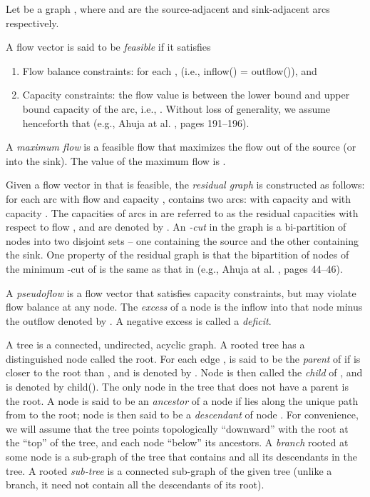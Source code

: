 \documentclass{article}
\begin{document}
Let  be a graph , where  and  are the source-adjacent and sink-adjacent arcs respectively.

A flow vector  is said to be {\em feasible} if it satisfies
\begin{enumerate}
\item Flow balance constraints: for each ,  (i.e., inflow() = outflow()), and
\item Capacity constraints: the flow value is between the lower bound and upper bound capacity of the arc, i.e.,  .  Without loss of generality, we assume henceforth that  (e.g., Ahuja at al. \cite{AhuMO93}, pages 191--196).
\end{enumerate}

A {\em maximum flow} is a feasible flow  that maximizes the flow out of the source (or into the sink).  The value of the maximum flow is .

Given a flow vector  in  that is feasible, the {\em residual graph}  is constructed as follows: for each arc  with flow  and capacity ,  contains two arcs:  with capacity  and  with capacity .  The capacities of arcs in  are referred to as the residual capacities with respect to flow , and are denoted by .  An {\em -cut} in the graph is a bi-partition of nodes into two disjoint sets -- one containing the source and the other containing the sink.  One property of the residual graph is that the bipartition of nodes of the minimum -cut of  is the same as that in  (e.g., Ahuja at al. \cite{AhuMO93}, pages 44--46).

A {\em pseudoflow}  is a flow vector that satisfies capacity constraints, but may violate flow balance at any node. The {\em excess} of a node  is the inflow into that node minus the outflow denoted by . A negative excess is called a {\em deficit}.

A tree  is a connected, undirected, acyclic graph.  A rooted tree has a distinguished node  called the root. For each edge ,  is said to be the {\em parent} of  if  is closer to the root than , and is denoted by . Node  is then called the {\em child} of , and is denoted by child(). The only node in the tree that does not have a parent is the root. A node  is said to be an {\em ancestor} of a node  if  lies along the unique path from  to the root; node  is then said to be a {\em descendant} of node . For convenience, we will assume that the tree points topologically ``downward'' with the root at the ``top'' of the tree, and each node ``below'' its ancestors. A {\em branch} rooted at some node  is a sub-graph of the tree that contains  and all its descendants in the tree.  A rooted {\em sub-tree} is a connected sub-graph of the given tree (unlike a branch, it need not contain all the descendants of its root). 
\end{document}
